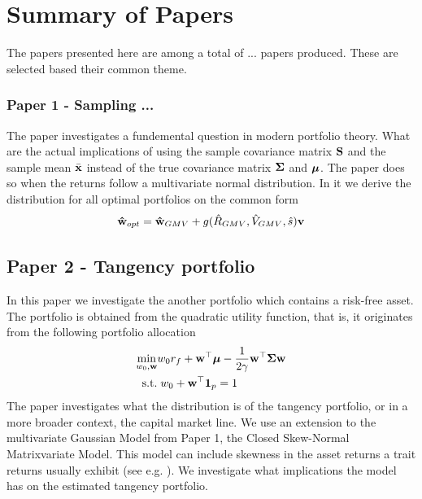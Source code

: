 \documentclass[]{book}\usepackage{knitr}
\begin{document}
\chapter{Summary of Papers}\label{ch:papersummary}

The papers presented here are among a total of ... papers produced. These are selected based their common theme.
\subsection*{Paper 1 - Sampling ...}\label{sec:paper1}
The paper investigates a fundemental question in modern portfolio theory. What are the actual implications of using the sample covariance matrix $\mathbf{S}$ and the sample mean $\bar{\mathbf{x}}$ instead of the true covariance matrix $\mathbf{\Sigma}$ and $\mbox{\boldmath$\mu$}$. The paper does so when the returns follow a multivariate normal distribution. In it we derive the distribution for all optimal portfolios on the common form
$$
\mathbf{\hat{w}}_{opt} = \mathbf{\hat{w}}_{GMV} + g(\hat{R}_{GMV}, \hat{V}_{GMV}, \hat{s})\mathbf{v}
$$


\section*{Paper 2 - Tangency portfolio}\label{sec:paper2}
In this paper we investigate the another portfolio which contains a risk-free asset. The portfolio is obtained from the quadratic utility function, that is, it originates from the following portfolio allocation 
\begin{align}
  \min_{w_0,\mathbf{w}} & w_0 r_f + \mathbf{w}^\top \mbox{\boldmath$\mu$} - \frac{1}{2\gamma} \mathbf{w}^\top \mathbf{\Sigma} \mathbf{w} \\
  \text{ s.t.} &\; w_0 + \mathbf{w}^\top \mathbf{1}_p = 1
\end{align}
The paper investigates what the distribution is of the tangency portfolio, or in a more broader context, the capital market line. We use an extension to the multivariate Gaussian Model from Paper 1, the Closed Skew-Normal Matrixvariate Model. This model can include skewness in the asset returns a trait returns usually exhibit (see e.g. \citet{cont2001empirical}). We investigate what implications the model has on the estimated tangency portfolio.
\end{document}
